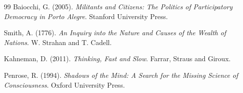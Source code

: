 \documentclass[11pt,a4paper]{article}
\begin{document}
\begin{thebibliography}{99}
Baiocchi, G. (2005). \textit{Militants and Citizens: The Politics of Participatory Democracy in Porto Alegre}. Stanford University Press.

Smith, A. (1776). \textit{An Inquiry into the Nature and Causes of the Wealth of Nations}. W. Strahan and T. Cadell.

Kahneman, D. (2011). \textit{Thinking, Fast and Slow}. Farrar, Straus and Giroux.

Penrose, R. (1994). \textit{Shadows of the Mind: A Search for the Missing Science of Consciousness}. Oxford University Press.

\end{thebibliography}
\end{document}

